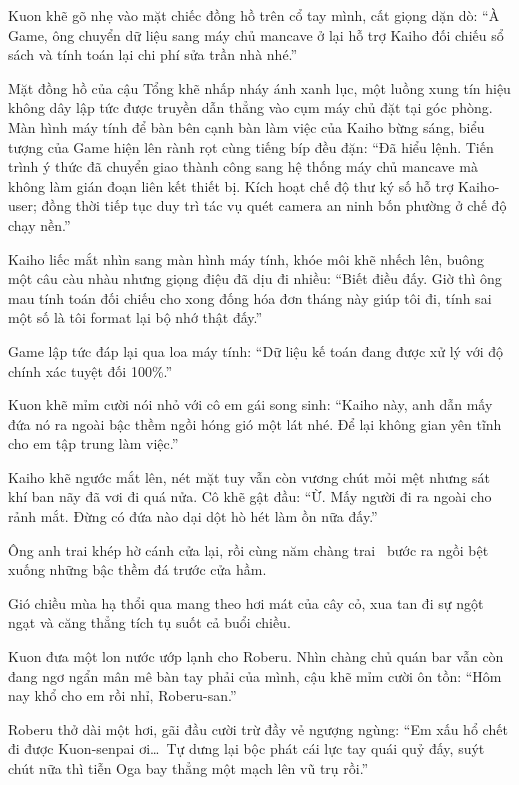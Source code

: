 \documentclass[../main.tex]{subfiles}
\begin{document}
Kuon khẽ gõ nhẹ vào mặt chiếc đồng hồ trên cổ tay mình, cất giọng dặn dò: ``À Game, ông chuyển dữ liệu sang máy chủ mancave ở lại hỗ trợ Kaiho đối chiếu sổ sách và tính toán lại chi phí sửa trần nhà nhé.''

Mặt đồng hồ của cậu Tổng khẽ nhấp nháy ánh xanh lục, một luồng xung tín hiệu không dây lập tức được truyền dẫn thẳng vào cụm máy chủ đặt tại góc phòng. Màn hình máy tính để bàn bên cạnh bàn làm việc của Kaiho bừng sáng, biểu tượng của Game hiện lên rành rọt cùng tiếng bíp đều đặn: ``Đã hiểu lệnh. Tiến trình ý thức đã chuyển giao thành công sang hệ thống máy chủ mancave mà không làm gián đoạn liên kết thiết bị. Kích hoạt chế độ thư ký số hỗ trợ Kaiho-user; đồng thời tiếp tục duy trì tác vụ quét camera an ninh bốn phường ở chế độ chạy nền.''

Kaiho liếc mắt nhìn sang màn hình máy tính, khóe môi khẽ nhếch lên, buông một câu càu nhàu nhưng giọng điệu đã dịu đi nhiều: ``Biết điều đấy. Giờ thì ông mau tính toán đối chiếu cho xong đống hóa đơn tháng này giúp tôi đi, tính sai một số là tôi format lại bộ nhớ thật đấy.''

Game lập tức đáp lại qua loa máy tính: ``Dữ liệu kế toán đang được xử lý với độ chính xác tuyệt đối 100\%.''

Kuon khẽ mỉm cười nói nhỏ với cô em gái song sinh: ``Kaiho này, anh dẫn mấy đứa nó ra ngoài bậc thềm ngồi hóng gió một lát nhé. Để lại không gian yên tĩnh cho em tập trung làm việc.''

Kaiho khẽ ngước mắt lên, nét mặt tuy vẫn còn vương chút mỏi mệt nhưng sát khí ban nãy đã vơi đi quá nửa. Cô khẽ gật đầu: ``Ừ. Mấy người đi ra ngoài cho rảnh mắt. Đừng có đứa nào dại dột hò hét làm ồn nữa đấy.''

Ông anh trai khép hờ cánh cửa lại, rồi cùng năm chàng trai \hls\ bước ra ngồi bệt xuống những bậc thềm đá trước cửa hầm.

\ct

Gió chiều mùa hạ thổi qua mang theo hơi mát của cây cỏ, xua tan đi sự ngột ngạt và căng thẳng tích tụ suốt cả buổi chiều.

Kuon đưa một lon nước ướp lạnh cho Roberu. Nhìn chàng chủ quán bar vẫn còn đang ngơ ngẩn mân mê bàn tay phải của mình, cậu khẽ mỉm cười ôn tồn: ``Hôm nay khổ cho em rồi nhỉ, Roberu-san.''

Roberu thở dài một hơi, gãi đầu cười trừ đầy vẻ ngượng ngùng: ``Em xấu hổ chết đi được Kuon-senpai ơi\dots\ Tự dưng lại bộc phát cái lực tay quái quỷ đấy, suýt chút nữa thì tiễn Oga bay thẳng một mạch lên vũ trụ rồi.''
\end{document}
